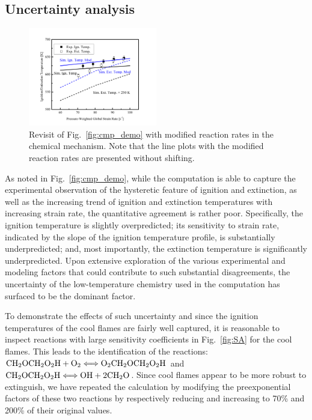 \documentclass[review,3p,times]{elsarticle}
\begin{document}
\clearpage

\subsection{Uncertainty analysis}\label{sec:uncertainty}

\begin{figure}[t]
  \centering
  \scriptsize
  \includegraphics[trim=6.5mm 7.5mm 7mm 8mm, clip=true, width=0.5\textwidth]{cmp_demo_mod.png}
  \normalsize
  \caption{Revisit of Fig.~\ref{fig:cmp_demo} with modified reaction rates in the chemical mechanism.  Note that the line plots with the modified reaction rates are presented without shifting.}
  \label{fig:cmp_demo_mod}
\end{figure}

As noted in Fig.~\ref{fig:cmp_demo}, while the computation is able to capture the experimental observation of the hysteretic feature of ignition and extinction, as well as the increasing trend of ignition and extinction temperatures with increasing strain rate, the quantitative agreement is rather poor.  Specifically, the ignition temperature is slightly overpredicted; its sensitivity to strain rate, indicated by the slope of the ignition temperature profile, is substantially underpredicted; and, most importantly, the extinction temperature is significantly underpredicted. Upon extensive exploration of the various experimental and modeling factors that could contribute to such substantial disagreements, the uncertainty of the low-temperature chemistry used in the computation has surfaced to be the dominant factor.

To demonstrate the effects of such uncertainty and since the ignition temperatures of the cool flames are fairly well captured, it is reasonable to inspect reactions with large sensitivity coefficients in Fig.~\ref{fig:SA} for the cool flames.  This leads to the identification of the reactions: $\rm{CH}_2\rm{OCH}_2\rm{O}_2\rm{H} + \rm{O}_2 \Longleftrightarrow \rm{O}_2\rm{CH}_2\rm{OCH}_2\rm{O}_2\rm{H}$ and $\rm{CH}_2\rm{OCH}_2\rm{O}_2\rm{H} \Longleftrightarrow \rm{OH} + 2\rm{CH}_2\rm{O}$.  Since cool flames appear to be more robust to extinguish, we have repeated the calculation by modifying the preexponential factors of these two reactions by respectively reducing and increasing to 70\% and 200\% of their original values.
\end{document}
